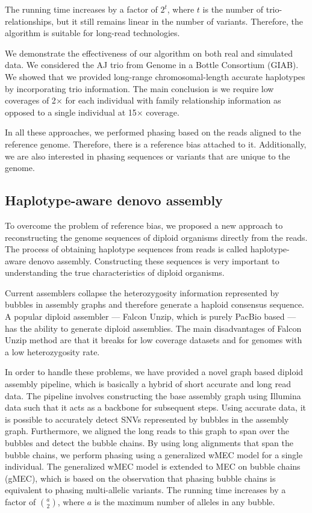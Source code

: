 The running time increases by a factor of $2^t$, where $t$ is the number of trio-relationships, but it still remains linear in the number of variants.
Therefore, the algorithm is suitable for long-read technologies.

We demonstrate the effectiveness of our algorithm on both real and simulated data. We considered the AJ trio from Genome in a Bottle Consortium (GIAB).
We showed that we provided long-range chromosomal-length accurate haplotypes by incorporating trio information.
The main conclusion is we require low coverages of 2$\times$ for each individual with family relationship information as opposed to a single individual at 15$\times$ coverage.

In all these approaches, we performed phasing based on the reads aligned to the reference genome. Therefore, there is a reference bias attached to it.
Additionally, we are also interested in phasing sequences or variants that are unique to the genome.

\subsection{Haplotype-aware denovo assembly}
To overcome the problem of reference bias, we proposed a new approach to reconstructing the genome sequences of diploid organisms directly from the reads.
The process of obtaining haplotype sequences from reads is called haplotype-aware denovo assembly.
Constructing these sequences is very important to understanding the true characteristics of diploid organisms.

Current assemblers collapse the heterozygosity information represented by bubbles in assembly graphs and therefore generate a haploid consensus sequence.
A popular diploid assembler --- Falcon Unzip, which is purely PacBio based --- has the ability to generate diploid assemblies.
The main disadvantages of Falcon Unzip method are that it breaks for low coverage datasets and for genomes with a low heterozygosity rate.

In order to handle these problems, we have provided a novel graph based diploid assembly pipeline, which is basically a hybrid of short accurate and long read data.
The pipeline involves constructing the base assembly graph using Illumina data such that it acts as a backbone for subsequent steps.
Using accurate data, it is possible to accurately detect SNVs represented by bubbles in the assembly graph.
Furthermore, we aligned the long reads to this graph to span over the bubbles and detect the bubble chains.
By using long alignments that span the bubble chains, we perform phasing using a generalized wMEC model for a single individual.
The generalized wMEC model is extended to MEC on bubble chains (gMEC), which is based on the observation that phasing bubble chains is equivalent to phasing multi-allelic variants.
The running time increases by a factor of $a \choose 2$, where $a$ is the maximum number of alleles in any bubble.

